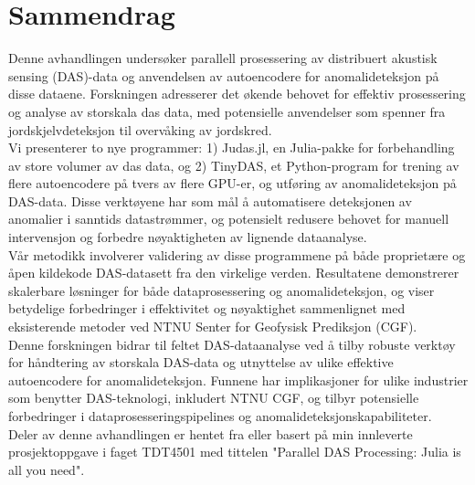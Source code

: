 \chapter*{Sammendrag}

Denne avhandlingen undersøker parallell prosessering av distribuert akustisk sensing (DAS)-data og anvendelsen av autoencodere for anomalideteksjon på disse dataene. Forskningen adresserer det økende behovet for effektiv prosessering og analyse av storskala \acrshort{das} data, med potensielle anvendelser som spenner fra jordskjelvdeteksjon til overvåking av jordskred. \\

Vi presenterer to nye programmer: 1) Judas.jl, en Julia-pakke for forbehandling av store volumer av \acrshort{das} data, og 2) TinyDAS, et Python-program for trening av flere autoencodere på tvers av flere GPU-er, og utføring av anomalideteksjon på DAS-data. Disse verktøyene har som mål å automatisere deteksjonen av anomalier i sanntids datastrømmer, og potensielt redusere behovet for manuell intervensjon og forbedre nøyaktigheten av lignende dataanalyse. \\

Vår metodikk involverer validering av disse programmene på både proprietære og åpen kildekode DAS-datasett fra den virkelige verden. Resultatene demonstrerer skalerbare løsninger for både dataprosessering og anomalideteksjon, og viser betydelige forbedringer i effektivitet og nøyaktighet sammenlignet med eksisterende metoder ved NTNU Senter for Geofysisk Prediksjon (CGF). \\

Denne forskningen bidrar til feltet DAS-dataanalyse ved å tilby robuste verktøy for håndtering av storskala DAS-data og utnyttelse av ulike effektive autoencodere for anomalideteksjon. Funnene har implikasjoner for ulike industrier som benytter DAS-teknologi, inkludert NTNU CGF, og tilbyr potensielle forbedringer i dataprosesseringspipelines og anomalideteksjonskapabiliteter. \\

Deler av denne avhandlingen er hentet fra eller basert på min innleverte prosjektoppgave i faget TDT4501 med tittelen "Parallel DAS Processing: Julia is all you need".

